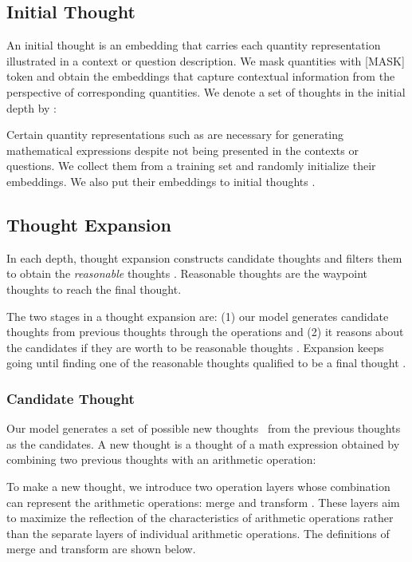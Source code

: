 \documentclass[11pt]{article}
\newcommand{\1}{\mathbb{1}}
\begin{document}
\subsection{Initial Thought}
\label{sub:initial_stage}

An initial thought is an embedding that carries each quantity representation illustrated in a context or question description.
We mask quantities with [MASK] token and obtain the embeddings that capture contextual information from the perspective of corresponding quantities.
We denote a set of thoughts in the initial depth by :


Certain quantity representations such as  are necessary for generating mathematical expressions despite not being presented in the contexts or questions. We collect them from a training set and randomly initialize their embeddings.
We also put their embeddings to initial thoughts .

\subsection{Thought Expansion}
In each depth, thought expansion constructs candidate thoughts  and filters them to obtain the \textit{reasonable} thoughts .
Reasonable thoughts are the waypoint thoughts to reach the final thought.

The two stages in a thought expansion are:
(1) our model generates candidate thoughts  from previous thoughts  through the operations
and (2) it reasons about the candidates if they are worth to be reasonable thoughts .
Expansion keeps going until finding one of the reasonable thoughts qualified to be a final thought .

\subsubsection{Candidate Thought}
Our model generates a set of possible new 
thoughts~ from the previous thoughts  as the candidates.
A new thought  is a thought of a math expression obtained by combining two previous thoughts  with an arithmetic operation:


To make a new thought, we introduce two operation layers whose combination can represent the arithmetic operations: merge  and transform .
These layers aim to maximize the reflection of the characteristics of arithmetic operations rather than the separate layers of individual arithmetic operations.
The definitions of merge and transform are shown below.
\end{document}
